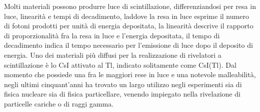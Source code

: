 Molti materiali possono produrre luce di scintillazione, differenziandosi per resa in luce, linearità e tempi di decadimento, laddove la resa in luce esprime il numero di fotoni prodotti per unità di energia depositata, la linearità descrive il rapporto di proporzionalità fra la resa in luce e l'energia depositata, il tempo di decadimento indica il tempo necessario per l'emissione di luce dopo il deposito di energia.
Uno dei materiali più diffusi per la realizzazione di rivelatori a scintillazione è lo CsI attivato al Tl, indicato solitamente come CsI(Tl). 
Dal momento che possiede una fra le maggiori rese in luce e una notevole malleabilità, negli ultimi cinquant'anni ha trovato un largo utilizzo negli esperimenti sia di fisica nucleare sia di fisica particellare, venendo impiegato nella rivelazione di particelle cariche o di raggi gamma.



